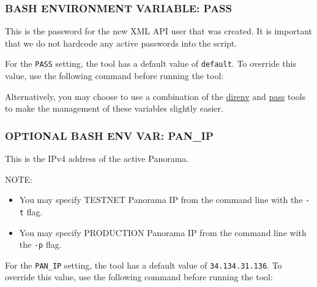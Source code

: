 \hypertarget{bash-environment-variable-pass}{%
\subsubsection{BASH ENVIRONMENT VARIABLE:
PASS}\label{bash-environment-variable-pass}}

This is the password for the new XML API user that was created. It is
important that we do not hardcode any active passwords into the script.

For the \texttt{PASS} setting, the tool has a default value of
\texttt{default}. To override this value, use the following command
before running the tool:

\begin{Shaded}
\begin{Highlighting}[]
 \NormalTok{ \# }  
  
 \KeywordTok{|}   
\end{Highlighting}
\end{Shaded}

Alternatively, you may choose to use a combination of the
\href{https://direnv.net/}{direnv} and
\href{https://www.passwordstore.org/}{pass} tools to make the management
of these variables slightly easier.

\hypertarget{optional-bash-env-var-pan_ip}{%
\subsubsection{OPTIONAL BASH ENV VAR:
PAN\_IP}\label{optional-bash-env-var-pan_ip}}

This is the IPv4 address of the active Panorama.

NOTE:

\begin{itemize}
\tightlist
\item
  You may specify TESTNET Panorama IP from the command line with the
  \texttt{-t} flag.
\item
  You may specify PRODUCTION Panorama IP from the command line with the
  \texttt{-p} flag.
\end{itemize}

For the \texttt{PAN\_IP} setting, the tool has a default value of
\texttt{34.134.31.136}. To override this value, use the following
command before running the tool:

